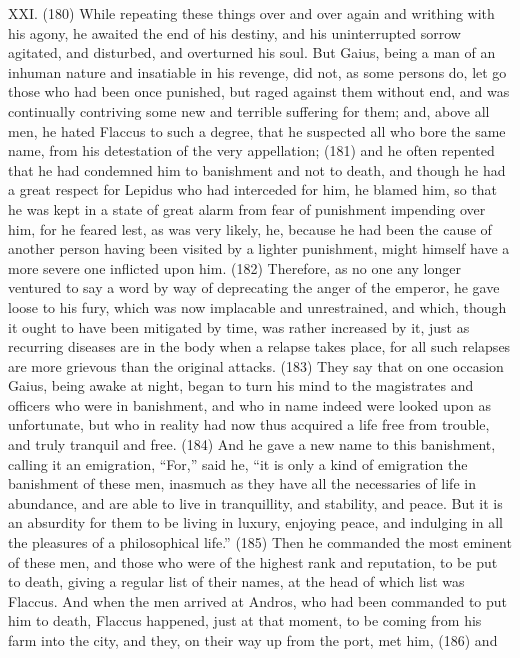 XXI. (180) While repeating these things over and over again and writhing with his agony, he
awaited the end of his destiny, and his uninterrupted sorrow agitated, and disturbed, and
overturned his soul. But Gaius, being a man of an inhuman nature and insatiable in his revenge, did
not, as some persons do, let go those who had been once punished, but raged against them
without end, and was continually contriving some new and terrible suffering for them; and, above all
men, he hated Flaccus to such a degree, that he suspected all who bore the same name, from his
detestation of the very appellation; (181) and he often repented that he had condemned him to
banishment and not to death, and though he had a great respect for Lepidus who had interceded
for him, he blamed him, so that he was kept in a state of great alarm from fear of punishment
impending over him, for he feared lest, as was very likely, he, because he had been the cause of
another person having been visited by a lighter punishment, might himself have a more severe one
inflicted upon him. (182) Therefore, as no one any longer ventured to say a word by way of
deprecating the anger of the emperor, he gave loose to his fury, which was now implacable and
unrestrained, and which, though it ought to have been mitigated by time, was rather increased by it,
just as recurring diseases are in the body when a relapse takes place, for all such relapses are
more grievous than the original attacks. (183) They say that on one occasion Gaius, being awake
at night, began to turn his mind to the magistrates and officers who were in banishment, and who in
name indeed were looked upon as unfortunate, but who in reality had now thus acquired a life free
from trouble, and truly tranquil and free. (184) And he gave a new name to this banishment, calling
it an emigration, ``For,'' said he, ``it is only a kind of emigration the banishment of these men,
inasmuch as they have all the necessaries of life in abundance, and are able to live in tranquillity,
and stability, and peace. But it is an absurdity for them to be living in luxury, enjoying peace, and
indulging in all the pleasures of a philosophical life.'' (185) Then he commanded the most eminent
of these men, and those who were of the highest rank and reputation, to be put to death, giving a
regular list of their names, at the head of which list was Flaccus. And when the men arrived at
Andros, who had been commanded to put him to death, Flaccus happened, just at that moment, to
be coming from his farm into the city, and they, on their way up from the port, met him, (186) and
